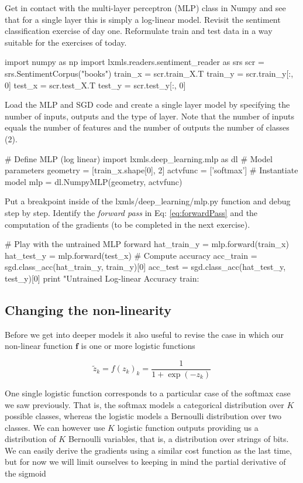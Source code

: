 \begin{exercise}
Get in contact with the multi-layer perceptron (MLP) class in Numpy and see
that for a single layer this is simply a log-linear model. Revisit the
sentiment classification exercise of day one. Reformulate train and test data
in a way suitable for the exercises of today.  
\begin{python}
import numpy as np
import lxmls.readers.sentiment_reader as srs  
scr     = srs.SentimentCorpus("books")
train_x = scr.train_X.T
train_y = scr.train_y[:, 0]
test_x  = scr.test_X.T
test_y  = scr.test_y[:, 0]
\end{python}
%
Load the MLP and SGD code and create a single layer model by specifying the
number of inputs, outputs and the type of layer. Note that the number of inputs
equals the number of features and the number of outputs the number of classes
(2).
%
\begin{python}
# Define MLP (log linear)
import lxmls.deep_learning.mlp as dl
# Model parameters
geometry = [train_x.shape[0], 2]
actvfunc = ['softmax']
# Instantiate model
mlp      = dl.NumpyMLP(geometry, actvfunc)
\end{python}
Put a breakpoint inside of the lxmls/deep\_learning/mlp.py function and debug
step by step. Identify the \textit{forward pass} in Eq: \ref{eq:forwardPass}
and the computation of the gradients (to be completed in the next exercise). 
\begin{python}
# Play with the untrained MLP forward
hat_train_y = mlp.forward(train_x) 
hat_test_y  = mlp.forward(test_x) 
# Compute accuracy
acc_train = sgd.class_acc(hat_train_y, train_y)[0]
acc_test  = sgd.class_acc(hat_test_y, test_y)[0]
print "Untrained Log-linear Accuracy train: %
\end{python}
\end{exercise}

\subsection{Changing the non-linearity}

Before we get into deeper models it also useful to revise the case in which our
non-linear function $\mathbf{f}$ is one or more logistic functions

\begin{equation}
\tilde{z}_k = f(z_k)_k = \frac{1}{1+\exp(-z_k)} 
\label{eq:sigmoid}
\end{equation}

One single logistic function corresponds to a particular case of the softmax
case we saw previously. That is, the softmax models a categorical distribution
over $K$ possible classes, whereas the logistic models a Bernoulli distribution
over two classes. We can however use $K$ logistic function outputs providing us
a distribution of $K$ Bernoulli variables, that is, a distribution over
strings of bits. We can easily derive the gradients using a similar cost
function as the last time, but for now we will limit ourselves to keeping in
mind the partial derivative of the sigmoid 

